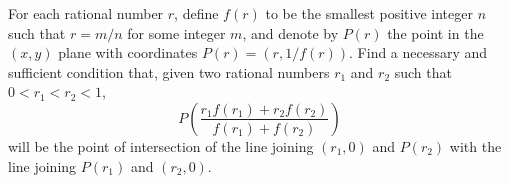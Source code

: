 For each rational number $r$, define $f(r)$ to be the smallest positive integer
$n$ such that $r = m/n$ for some integer $m$, and denote by $P(r)$ the point in
the $(x, y)$ plane with coordinates $P(r) = (r, 1/f(r))$. Find a necessary and
sufficient condition that, given two rational numbers $r_1$ and $r_2$ such that
$0 < r_1 < r_2 < 1$,
$$ P\left( \frac{r_1 f(r_1) + r_2 f(r_2)}{f(r_1) + f(r_2)} \right) $$
will be the point of intersection of the line joining $(r_1, 0)$ and $P(r_2)$
with the line joining $P(r_1)$ and $(r_2, 0)$.
